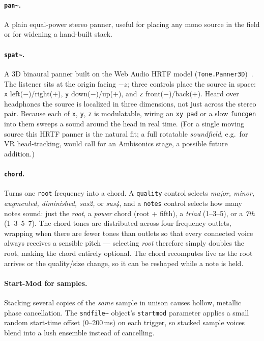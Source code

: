 \documentclass[11pt,letterpaper]{article}
\begin{document}
\paragraph{\texttt{pan\~{}}.} A plain equal-power stereo panner, useful for placing any mono
source in the field or for widening a hand-built stack.

\paragraph{\texttt{spat\~{}}.} A 3D binaural panner built on the Web Audio HRTF
model (\texttt{Tone.Panner3D})~\cite{webaudio}. The listener sits at the origin facing
$-z$; three controls place the source in space: \texttt{x} left($-$)/right($+$),
\texttt{y} down($-$)/up($+$), and \texttt{z} front($-$)/back($+$). Heard over headphones the
source is localized in three dimensions, not just across the stereo pair. Because each of
\texttt{x}, \texttt{y}, \texttt{z} is modulatable, wiring an \texttt{xy pad} or a slow
\texttt{funcgen} into them sweeps a sound around the head in real time. (For a single moving
source this HRTF panner is the natural fit; a full rotatable \emph{soundfield}, e.g.\ for VR
head-tracking, would call for an Ambisonics stage, a possible future addition.)

\paragraph{\texttt{chord}.} Turns one \texttt{root} frequency into a chord. A \texttt{quality}
control selects \emph{major, minor, augmented, diminished, sus2,} or \emph{sus4}, and a
\texttt{notes} control selects how many notes sound: just the \emph{root}, a \emph{power} chord
(root + fifth), a \emph{triad} (1--3--5), or a \emph{7th} (1--3--5--7). The chord tones are
distributed across four frequency outlets, wrapping when there are fewer tones than outlets so
that every connected voice always receives a sensible pitch --- selecting \emph{root} therefore
simply doubles the root, making the chord entirely optional. The chord recomputes live as the
root arrives or the quality/size change, so it can be reshaped while a note is held.

\paragraph{Start-Mod for samples.} Stacking several copies of the \emph{same} sample in unison
causes hollow, metallic phase cancellation. The \texttt{sndfile\~{}} object's \texttt{startmod}
parameter applies a small random start-time offset (0--200\,ms) on each trigger, so stacked
sample voices blend into a lush ensemble instead of cancelling.
\end{document}
